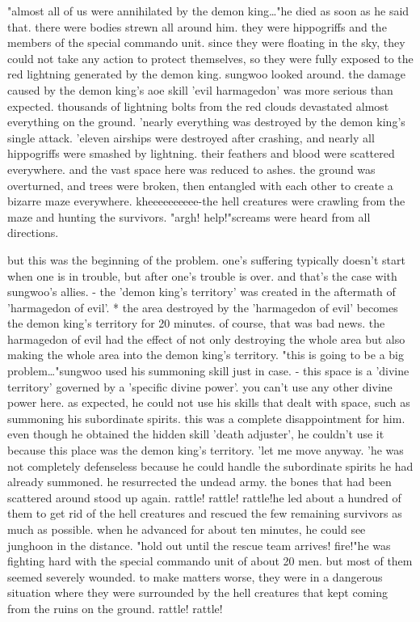 "almost all of us were annihilated by the demon king…"he died as soon as he said that.
 there were bodies strewn all around him.
they were hippogriffs and the members of the special commando unit.
 since they were floating in the sky, they could not take any action to protect themselves, so they were fully exposed to the red lightning generated by the demon king.
 sungwoo looked around.
the damage caused by the demon king's aoe skill 'evil harmagedon' was more serious than expected.
 thousands of lightning bolts from the red clouds devastated almost everything on the ground.
'nearly everything was destroyed by the demon king's single attack.
'eleven airships were destroyed after crashing, and nearly all hippogriffs were smashed by lightning.
 their feathers and blood were scattered everywhere.
 and the vast space here was reduced to ashes.
 the ground was overturned, and trees were broken, then entangled with each other to create a bizarre maze everywhere.
 kheeeeeeeeee-the hell creatures were crawling from the maze and hunting the survivors.
"argh! help!"screams were heard from all directions.
 

but this was the beginning of the problem.
 one's suffering typically doesn't start when one is in trouble, but after one's trouble is over.
 and that's the case with sungwoo's allies.
 - the 'demon king's territory' was created in the aftermath of 'harmagedon of evil'.
* the area destroyed by the 'harmagedon of evil' becomes the demon king's territory for 20 minutes.
 of course, that was bad news.
the harmagedon of evil had the effect of not only destroying the whole area but also making the whole area into the demon king's territory.
 "this is going to be a big problem…"sungwoo used his summoning skill just in case.
- this space is a 'divine territory' governed by a 'specific divine power'.
 you can't use any other divine power here.
as expected, he could not use his skills that dealt with space, such as summoning his subordinate spirits.
this was a complete disappointment for him.
 even though he obtained the hidden skill 'death adjuster', he couldn't use it because this place was the demon king's territory.
'let me move anyway.
'he was not completely defenseless because he could handle the subordinate spirits he had already summoned.
 he resurrected the undead army.
 the bones that had been scattered around stood up again.
rattle! rattle! rattle!he led about a hundred of them to get rid of the hell creatures and rescued the few remaining survivors as much as possible.
 when he advanced for about ten minutes, he could see junghoon in the distance.
"hold out until the rescue team arrives! fire!"he was fighting hard with the special commando unit of about 20 men.
but most of them seemed severely wounded.
 to make matters worse, they were in a dangerous situation where they were surrounded by the hell creatures that kept coming from the ruins on the ground.
rattle! rattle!

 